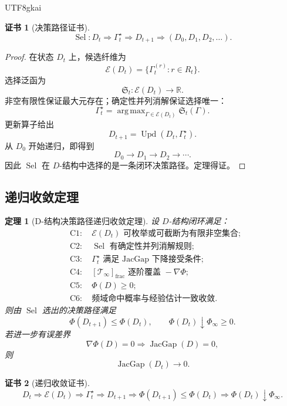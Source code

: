 \documentclass[12pt]{article}
\newtheorem{theorem}{定理}[section]
\newtheorem{Certificate}{证书}[section]
\newcommand{\RR}{\mathbb{R}}
\DeclareMathOperator{\JacGap}{JacGap}
\DeclareMathOperator{\Sel}{Sel}
\DeclareMathOperator{\Upd}{Upd}
\DeclareMathOperator*{\argmax}{arg\,max}
\begin{document}
\begin{CJK*}{UTF8}{gkai}
\begin{Certificate}[决策路径证书]
\[
\boxed{
\Sel:
D_t
\Rightarrow
\Gamma_t^\star
\Rightarrow
D_{t+1}
\Rightarrow
(D_0,D_1,D_2,\ldots).
}
\]
\end{Certificate}

\begin{proof}
在状态 \(D_t\) 上，候选纤维为
\[
\mathcal E(D_t)=\{\Gamma_t^{(r)}:r\in R_t\}.
\]
选择泛函为
\[
\mathfrak S_t:\mathcal E(D_t)\to\RR.
\]
非空有限性保证最大元存在；确定性并列消解保证选择唯一：
\[
\Gamma_t^\star
=
\argmax_{\Gamma\in\mathcal E(D_t)}
\mathfrak S_t(\Gamma).
\]
更新算子给出
\[
D_{t+1}=\Upd(D_t,\Gamma_t^\star).
\]
从 \(D_0\) 开始递归，即得到
\[
D_0\to D_1\to D_2\to\cdots.
\]
因此 \(\Sel\) 在 \(D\)-结构中选择的是一条闭环决策路径。定理得证。
\end{proof}

\subsection{递归收敛定理}
\label{subsec:d-structure-recursive-convergence}

\begin{theorem}[D-结构决策路径递归收敛定理]
设 \(D\)-结构闭环满足：
\[
\begin{aligned}
&\mathrm{C1}:\quad \mathcal E(D_t)\text{ 可枚举或可截断为有限非空集合};\\
&\mathrm{C2}:\quad \Sel\text{ 有确定性并列消解规则};\\
&\mathrm{C3}:\quad \Gamma_t^\star\text{ 满足 JacGap 下降接受条件};\\
&\mathrm{C4}:\quad [\mathcal T_\infty]_{\mathrm{frac}}\text{ 逐阶覆盖 }-\nabla\Phi;\\
&\mathrm{C5}:\quad \Phi(D)\ge0;\\
&\mathrm{C6}:\quad \text{频域命中概率与经验估计一致收敛}.
\end{aligned}
\]
则由 \(\Sel\) 选出的决策路径满足
\[
\boxed{
\Phi(D_{t+1})\le\Phi(D_t),
\qquad
\Phi(D_t)\downarrow\Phi_\infty\ge0.
}
\]
若进一步有误差界
\[
\nabla\Phi(D)=0\Rightarrow \JacGap(D)=0,
\]
则
\[
\boxed{
\JacGap(D_t)\to0.
}
\]
\end{theorem}

\begin{Certificate}[递归收敛证书]
\[
\boxed{
D_t
\Rightarrow
\mathcal E(D_t)
\Rightarrow
\Gamma_t^\star
\Rightarrow
D_{t+1}
\Rightarrow
\Phi(D_{t+1})\le\Phi(D_t)
\Rightarrow
\Phi(D_t)\downarrow\Phi_\infty.
}
\]
\end{Certificate}


\end{CJK*}
\end{document}
